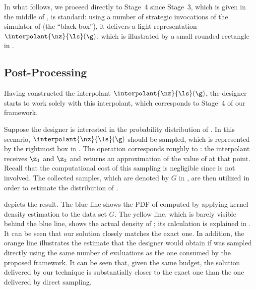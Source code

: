 In what follows, we proceed directly to Stage~4 since Stage~3, which is given in
the middle of , is standard: using a number of strategic
invocations of the simulator of \g (the ``black box''), it delivers a light
representation $\interpolant{\nz}{\ls}(\g)$, which is illustrated by a small
rounded rectangle in .

\subsection{Post-Processing}

Having constructed the interpolant $\interpolant{\nz}{\ls}(\g)$, the designer
starts to work solely with this interpolant, which corresponds to Stage~4 of our
framework.

Suppose the designer is interested in the probability distribution of \g. In
this scenario, $\interpolant{\nz}{\ls}(\g)$ should be sampled, which is
represented by the rightmost box in . The operation
corresponds roughly to : the interpolant receives $\z_1$
and $\z_2$ and returns an approximation of the value of \g at that point. Recall
that the computational cost of this sampling is negligible since \g is not
involved. The collected samples, which are denoted by $G$ in
, are then utilized in order to estimate the
distribution of \g.

 depicts the result. The blue line shows the \ac{PDF} of \g
computed by applying kernel density estimation \cite{hastie2013} to the data set
$G$. The yellow line, which is barely visible behind the blue line, shows the
actual density of \g; its calculation is explained in . It
can be seen that our solution closely matches the exact one. In addition, the
orange line illustrates the estimate that the designer would obtain if \g was
sampled directly using the same number of evaluations as the one consumed by the
proposed framework. It can be seen that, given the same budget, the solution
delivered by our technique is substantially closer to the exact one than the one
delivered by direct sampling.
